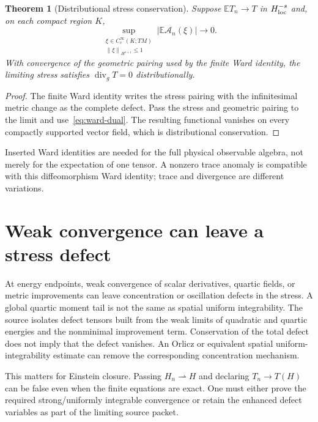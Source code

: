 \documentclass[11pt,a4paper,oneside]{book}
\theoremstyle{plain}
\newtheorem{theorem}{Theorem}[chapter]
\theoremstyle{definition}
\theoremstyle{remark}
\newcommand{\E}{\mathbb E}
\newcommand{\norm}[1]{\left\lVert#1\right\rVert}
\newcommand{\src}[2]{\cite{#1}}
\begin{document}
\begin{theorem}[Distributional stress conservation]
\label{thm:ward-descent}
Suppose $\E T_n\to T$ in $H^{-s}_{\rm loc}$ and, on each compact region $K$,
\begin{equation}
 \sup_{\substack{\xi\in C_c^\infty(K;TM)\\
                 \norm{\xi}_{H^{s+1}}\le1}}
 |\E\mathcal A_n(\xi)|\longrightarrow0.
 \label{eq:ward-dual}
\end{equation}
With convergence of the geometric pairing used by the finite Ward identity, the limiting stress satisfies $\operatorname{div}_gT=0$ distributionally.
\end{theorem}
\begin{proof}
The finite Ward identity writes the stress pairing with the infinitesimal metric change as the complete defect. Pass the stress and geometric pairing to the limit and use~\eqref{eq:ward-dual}. The resulting functional vanishes on every compactly supported vector field, which is distributional conservation.
\end{proof}
\src{R18}{thm:v18v41-ward-descent}
Inserted Ward identities are needed for the full physical observable algebra, not merely for the expectation of one tensor. A nonzero trace anomaly is compatible with this diffeomorphism Ward identity; trace and divergence are different variations. \src{R2}{thm:v2v93-trace-conservation}

\section{Weak convergence can leave a stress defect}
At energy endpoints, weak convergence of scalar derivatives, quartic fields, or metric improvements can leave concentration or oscillation defects in the stress. A global quartic moment tail is not the same as spatial uniform integrability. The source isolates defect tensors built from the weak limits of quadratic and quartic energies and the nonminimal improvement term. Conservation of the total defect does not imply that the defect vanishes. An Orlicz or equivalent spatial uniform-integrability estimate can remove the corresponding concentration mechanism. \cite{R1,R2}

This matters for Einstein closure. Passing $H_n\rightharpoonup H$ and declaring $T_n\to T(H)$ can be false even when the finite equations are exact. One must either prove the required strong/uniformly integrable convergence or retain the enhanced defect variables as part of the limiting source packet.
\end{document}
